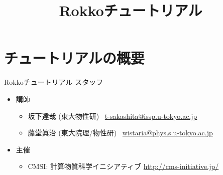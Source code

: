 \title{Rokkoチュートリアル}

\newtheorem{rei}{例}
\renewcommand{\therei}{}
\newcommand{\smallscr}[1]{\scalebox{0.4}{$#1$}}
\newcommand{\middlescr}[1]{\scalebox{0.60}{$#1$}}

\newlength\savedwidth
\newcommand\whline{%
    \noalign{\xdef\origarrayrulewidth{\the\arrayrulewidth}%
    \global\arrayrulewidth 3\arrayrulewidth}%
    \hline%
    \noalign{\global\arrayrulewidth\origarrayrulewidth}%
}

\AtBeginSection[]{
    \begin{frame}
        \tableofcontents[currentsection]
    \end{frame}
}




\begin{frame}
  \titlepage
\end{frame}


\section{チュートリアルの概要}

\begin{frame}{Rokkoチュートリアル スタッフ}
  \begin{itemize}
  \item 講師
    \setlength{\itemsep}{1em}
    \begin{itemize}
      \setlength{\itemsep}{1em}
    \item 坂下達哉 (東大物性研) \ \href{mailto:t-sakashita@issp.u-tokyo.ac.jp}{t-sakashita@issp.u-tokyo.ac.jp}
    \item 藤堂眞治 (東大院理/物性研) \ \href{mailto:wistaria@phys.s.u-tokyo.ac.jp}{wistaria@phys.s.u-tokyo.ac.jp}
    \end{itemize}
  \item 主催
    \begin{itemize}
    \item CMSI: 計算物質科学イニシアティブ \url{http://cms-initiative.jp/}
    \end{itemize}
  \end{itemize}
\end{frame}

